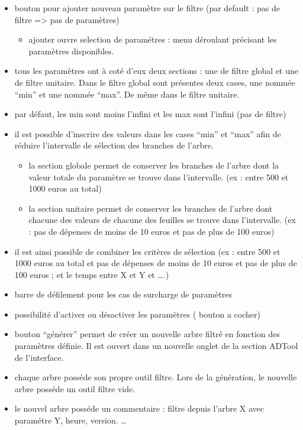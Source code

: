 		\begin{itemize}
		  \item bouton pour ajouter nouveau paramètre sur le filtre (par default : pas de filtre => pas de paramètres) 
			  \begin{itemize}
			  	 \item ajouter ouvre selection de paramétres : menu déroulant précisant les paramètres disponibles.
			  \end{itemize}
		  \item tous les paramètres ont à coté d’eux deux sections : une de filtre global et une de filtre unitaire. Dans le filtre global sont présentes deux cases, une nommée “min” et une nommée “max”. De même dans le filtre unitaire.
		  \item par défaut, les min sont moins l'infini et les max sont l’infini (pas de filtre)
		  \item il est possible d’inscrire des valeurs dans les cases “min” et “max” afin de réduire l’intervalle de sélection des branches de l'arbre.
		  \begin{itemize}
			  	 \item la section globale permet de conserver les branches de l’arbre dont la valeur totale du paramètre se trouve dans l’intervalle. (ex : entre 500 et 1000 euros au total)
			  	 \item la section unitaire permet de conserver les branches de l’arbre dont chacune des valeurs de chacune des feuilles se trouve dans l’intervalle. (ex : pas de dépenses de moins de 10 euros et pas de plus de 100 euros)
		  \end{itemize}
		  \item il est ainsi possible de combiner les critères de sélection (ex : entre 500 et 1000 euros au total et pas de dépenses de moins de 10 euros et pas de plus de 100 euros ; et le temps entre X et Y et ….)
		  \item barre de défilement pour les cas de surcharge de paramètres
		  \item possibilité d'activer ou désactiver les paramètres ( bouton a cocher)
		  \item bouton ``générer'' permet de créer un nouvelle arbre filtré en fonction des paramètres définie. Il est ouvert dans un nouvelle onglet de la section ADTool de l'interface. 
		  \item chaque arbre posséde son propre outil filtre. Lors de la génération, le nouvelle arbre posséde un outil filtre vide. 
		  \item le nouvel arbre posséde un commentaire : filtre depuis l'arbre X avec paramétre Y, heure, version. \ldots
		  \end{itemize}


